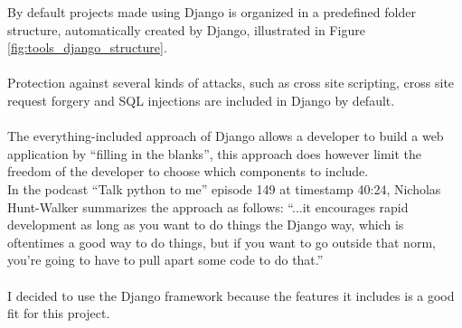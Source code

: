 By default projects made using Django is organized in a predefined folder structure, automatically created by Django, illustrated in Figure \ref{fig:tools_django_structure}.\\\\
Protection against several kinds of attacks, such as cross site scripting, cross site request forgery and SQL injections are included in Django by default.\\\\
The everything-included approach of Django allows a developer to build a web application by ``filling in the blanks'', this approach does however limit the freedom of the developer to choose which components to include.\\In the podcast ``Talk python to me'' episode 149 \cite{talk_python} at timestamp 40:24, Nicholas Hunt-Walker summarizes the approach as follows: ``...it encourages rapid development as long as you want to do things the Django way, which is oftentimes a good way to do things, but if you want to go outside that norm, you're going to have to pull apart some code to do that.''\\\\
I decided to use the Django framework because the features it includes is a good fit for this project.


